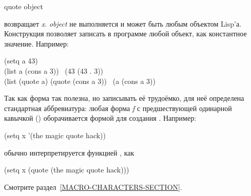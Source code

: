 \begin{defspec}
quote object

 возвращает \emph{x}.
\emph{object} не выполняется и может быть любым объектом Lisp'а.
Конструкция позволяет записать в программе любой объект, как константное
значение.
Например:
\begin{lisp}
(setq a 43) \\
(list a (cons a 3)) \EV\ (43 (43 . 3)) \\
(list (quote a) (quote (cons a 3)) \EV\ (a (cons a 3))
\end{lisp}
Так как  форма так полезна, но записывать её трудоёмко, для неё
определена стандартная аббревиатура:
любая форма \emph{f} с предшествующей одинарной кавычкой ()
оборачивается формой  для создания .
Например:
\begin{lisp}
(setq x '(the magic quote hack))
\end{lisp}
обычно интерпретируется функцией , как
\begin{lisp}
(setq x (quote (the magic quote hack)))
\end{lisp}
Смотрите раздел~\ref{MACRO-CHARACTERS-SECTION}.
\end{defspec}

